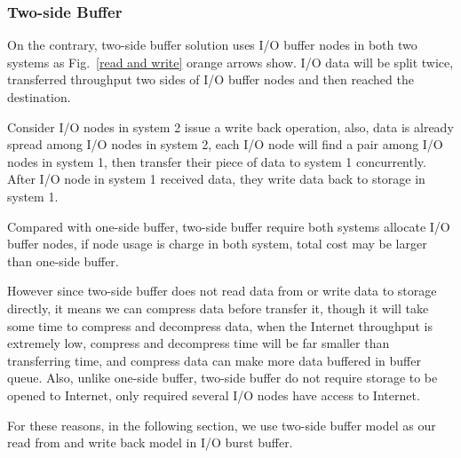 
\subsubsection{Two-side Buffer}

On the contrary, two-side buffer solution uses I/O buffer nodes in both two systems as Fig.~\ref{read and write} orange arrows show.
I/O data will be split twice, transferred throughput two sides of I/O buffer nodes and then reached the destination.

Consider I/O nodes in system 2 issue a write back operation, also, data is already spread among I/O nodes in system 2, each I/O node will find a pair among I/O nodes in system 1, then transfer their piece of data to system 1 concurrently.
After I/O node in system 1 received data, they write data back to storage in system 1.

Compared with one-side buffer, %
two-side buffer require both systems allocate I/O buffer nodes, if node usage is charge in both system, total cost may be larger than one-side buffer.

However since two-side buffer does not read data from or write data to storage directly, it means we can compress data before transfer it, though it will take some time to compress and decompress data, when the Internet throughput is extremely low, compress and decompress time will be far smaller than transferring time, and compress data can make more data buffered in buffer queue.
Also, unlike one-side buffer, two-side buffer do not require storage to be opened to Internet, only required several I/O nodes have access to Internet.

For these reasons, in the following section, we use two-side buffer model as our read from and write back model in I/O burst buffer.

